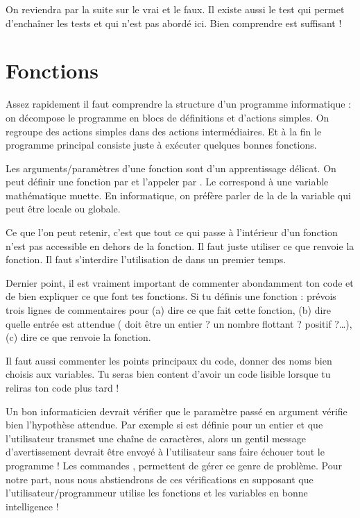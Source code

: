 \documentclass[11pt,class=report,crop=false]{standalone}
\begin{document}
On reviendra par la suite sur le \og{}vrai\fg{} et le \og{}faux\fg{}.
Il existe aussi le test  qui permet d'enchaîner les tests et qui n'est pas abordé ici. 
Bien comprendre  est suffisant ! 


\section{Fonctions}

Assez rapidement il faut comprendre la structure d'un programme informatique : on décompose le programme en blocs de définitions et d'actions simples. On regroupe des actions simples dans des actions intermédiaires. Et à la fin le programme principal consiste juste à exécuter quelques bonnes fonctions.

Les arguments/paramètres d'une fonction sont d'un apprentissage délicat.
On peut définir une fonction par  et l'appeler par
. Le  correspond à une variable mathématique muette. 
En informatique, on préfère parler de la  de la variable qui peut être locale ou globale.

Ce que l'on peut retenir, c'est que tout ce qui passe à l'intérieur d'un fonction n'est pas accessible en dehors de la fonction. Il faut juste utiliser ce que renvoie la fonction.
Il faut s’interdire l'utilisation de  dans un premier temps.

Dernier point, il est vraiment important de commenter abondamment ton code et de bien expliquer ce que font tes fonctions. Si tu définis une fonction  : prévois trois lignes de commentaires pour (a) dire ce que fait cette fonction, (b) dire quelle entrée est attendue ( doit être un entier ? un nombre flottant ? positif ?\ldots), (c) dire ce que renvoie la fonction.

Il faut aussi commenter les points principaux du code, donner des noms bien choisis aux variables. Tu seras bien content d'avoir un code lisible lorsque tu reliras ton code plus tard !

Un bon informaticien devrait vérifier que le paramètre passé en argument vérifie bien l'hypothèse attendue. Par exemple si  est définie pour un entier  et que l'utilisateur transmet une chaîne de caractères, alors un gentil message d'avertissement devrait être envoyé à l'utilisateur sans faire échouer tout le programme !
Les commandes ,  permettent de gérer ce genre de problème. 
Pour notre part, nous nous abstiendrons de ces vérifications en supposant que l'utilisateur/programmeur utilise les fonctions et les variables en bonne intelligence !
\end{document}

